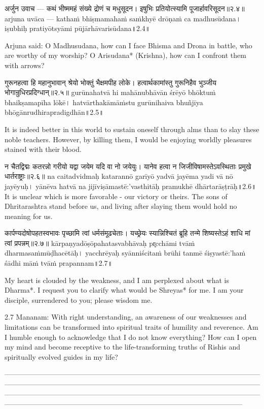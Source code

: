 अर्जुन उवाच —
कथं भीष्ममहं सं‍ख्ये द्रोणं च मधुसूदन।
 इषुभिः प्रतियोत्स्यामि पूजार्हावरिसूदन॥२.४॥
arjuna uvāca —
kathaṁ bhīṣmamahaṁ saṁ‍khyē drōṇaṁ ca madhusūdana।
iṣubhiḥ pratiyōtsyāmi pūjārhāvarisūdana॥2.4॥

Arjuna said: 
O Madhusudana, how can I face Bhisma and Drona in battle, who are worthy of my worship? O Arisudana* (Krishna), how can I confront them with arrows?


गुरूनहत्वा हि महानुभावान् श्रेयो भोक्तुं भैक्षमपीह लोके।
 हत्वार्थकामांस्तु गुरूनिहैव भुञ्जीय भोगान्रुधिरप्रदिग्धान्॥२.५॥
gurūnahatvā hi mahānubhāvān śrēyō bhōktuṁ bhaikṣamapīha lōkē।
hatvārthakāmāṁstu gurūnihaiva bhuñjīya bhōgānrudhirapradigdhān॥2.5॥

It is indeed better in this world to sustain oneself through alms than to slay these noble teachers. However, by killing them, I would be enjoying worldly pleasures stained with their blood.

न चैतद्विद्मः कतरन्नो गरीयो यद्वा जयेम यदि वा नो जयेयुः।
 यानेव हत्वा न जिजीविषामस्तेऽवस्थिताः प्रमुखे धार्तराष्ट्राः॥२.६॥
na caitadvidmaḥ katarannō garīyō yadvā jayēma yadi vā nō jayēyuḥ।
yānēva hatvā na jijīviṣāmastē:'vasthitāḥ pramukhē dhārtarāṣṭrāḥ॥2.6॥
 It is unclear which is more favorable - our victory or theirs. The sons of Dhritarashtra stand before us, and living after slaying them would hold no meaning for us.

कार्पण्यदोषोपहतस्वभावः पृच्छामि त्वां धर्मसंमूढचेताः।
 यच्छ्रेयः स्यान्निश्चितं ब्रूहि तन्मे शिष्यस्तेऽहं शाधि मां त्वां प्रपन्नम्॥२.७॥
kārpaṇyadōṣōpahatasvabhāvaḥ pr̥cchāmi tvāṁ dharmasaṁmūḍhacētāḥ।
yacchrēyaḥ syānniścitaṁ brūhi tanmē śiṣyastē:'haṁ śādhi māṁ tvāṁ prapannam॥2.7॥

My heart is clouded by the weakness, and I am perplexed about what is Dharma*. I request you to clarify what would be Shreyas* for me. I am your disciple, surrendered to you; please wisdom me.

2.7 Mananam: 
With right understanding, an awareness of our weaknesses and limitations can be transformed into spiritual traits of humility and reverence. 
Am I humble enough to acknowledge that I do not know everything? How can I open my mind and become receptive to the life-transforming truths of Rishis and spiritually evolved guides in my life?

-----------------------------------------------------------------------------------------------------------------------------------------------------------------------------------------------------------------------------------------------------------------------------------------------------------------------------------------------------------------------------------------------------------------------------------------

